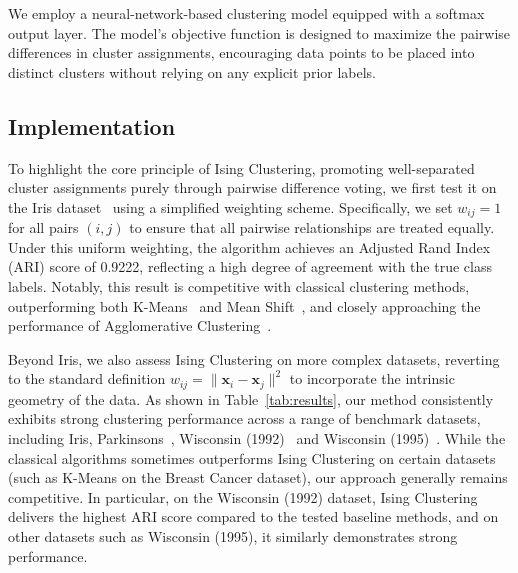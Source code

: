 \documentclass[journal]{IEEEtran}
\begin{document}


We employ a neural-network-based clustering model equipped with a softmax output layer. The model’s objective function is designed to maximize the pairwise differences in cluster assignments, encouraging data points to be placed into distinct clusters without relying on any explicit prior labels.

\subsection{Implementation}


To highlight the core principle of Ising Clustering, promoting well-separated cluster assignments purely through pairwise difference voting, we first test it on the Iris dataset~\cite{fisher1936use} using a simplified weighting scheme. Specifically, we set \( w_{ij} = 1 \) for all pairs \((i, j)\) to ensure that all pairwise relationships are treated equally. Under this uniform weighting, the algorithm achieves an Adjusted Rand Index (ARI) score of 0.9222, reflecting a high degree of agreement with the true class labels. Notably, this result is competitive with classical clustering methods, outperforming both K-Means~\cite{lloyd1982least} and Mean Shift~\cite{derpanis2005mean}, and closely approaching the performance of Agglomerative Clustering~\cite{murtagh2014ward}.

Beyond Iris, we also assess Ising Clustering on more complex datasets, reverting to the standard definition \( w_{ij} = \| \mathbf{x}_i - \mathbf{x}_j \|^2 \) to incorporate the intrinsic geometry of the data. As shown in Table~\ref{tab:results}, our method consistently exhibits strong clustering performance across a range of benchmark datasets, including Iris, Parkinsons~\cite{parkinsons_174}, Wisconsin (1992)~\cite{breast_cancer_wisconsin_(original)_15} and Wisconsin (1995)~\cite{breast_cancer_wisconsin_(diagnostic)_17}. While the classical algorithms sometimes outperforms Ising Clustering on certain datasets (such as K-Means on the Breast Cancer dataset), our approach generally remains competitive. In particular, on the Wisconsin (1992) dataset, Ising Clustering delivers the highest ARI score compared to the tested baseline methods, and on other datasets such as Wisconsin (1995), it similarly demonstrates strong performance.
\end{document}
